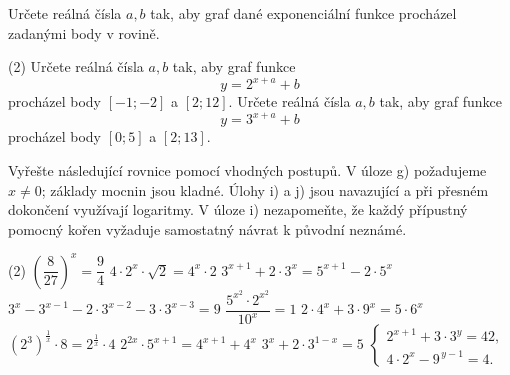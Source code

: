 \documentclass[12pt,a4paper]{article}
\begin{document}
\setcounter{section}{4}
\begin{exercise}
Určete reálná čísla $a,b$ tak, aby graf dané exponenciální funkce procházel
zadanými body v rovině.

\begin{tasks}(2)
    \task Určete reálná čísla $a,b$ tak, aby graf funkce
    \[
        y = 2^{x+a} + b
    \]
    procházel body $[-1;-2]$ a $[2;12]$.
    \task Určete reálná čísla $a,b$ tak, aby graf funkce
    \[
        y = 3^{x+a} + b
    \]
    procházel body $[0;5]$ a $[2;13]$.
\end{tasks}

\end{exercise}


\begin{exercise}
Vyřešte následující rovnice pomocí vhodných postupů.
V úloze g) požadujeme $x\neq0$; základy mocnin jsou kladné.
Úlohy i) a j) jsou navazující a při přesném dokončení využívají logaritmy.
V úloze i) nezapomeňte, že každý přípustný pomocný kořen vyžaduje samostatný návrat k původní neznámé.

\begin{tasks}(2)
    \task $\left(\dfrac{8}{27}\right)^{x} = \dfrac{9}{4}$
    \task $4 \cdot 2^{x} \cdot \sqrt{2} = 4^{x} \cdot 2$
    \task $3^{x+1} + 2 \cdot 3^{x} = 5^{x+1} - 2 \cdot 5^{x}$
    \task $3^{x} - 3^{x-1} - 2 \cdot 3^{x-2} - 3 \cdot 3^{x-3} = 9$
    \task $\dfrac{5^{x^{2}} \cdot 2^{x^{2}}}{10^{x}} = 1$
    \task $2 \cdot 4^{x} + 3 \cdot 9^{x} = 5 \cdot 6^{x}$
    \task $\left(2^3\right)^{\frac1x} \cdot 8 = 2^{\frac1x} \cdot 4$
    \task $2^{2x} \cdot 5^{x+1} = 4^{x+1} + 4^{x}$
    \task $3^{x} + 2 \cdot 3^{1-x} = 5$
    \task
        $\begin{cases}
            2^{x+1} + 3 \cdot 3^{y} = 42,\\[2mm] 
            4 \cdot 2^{x} - 9^{\,y-1} = 4.
        \end{cases}$
\end{tasks}

\end{exercise}
\end{document}
